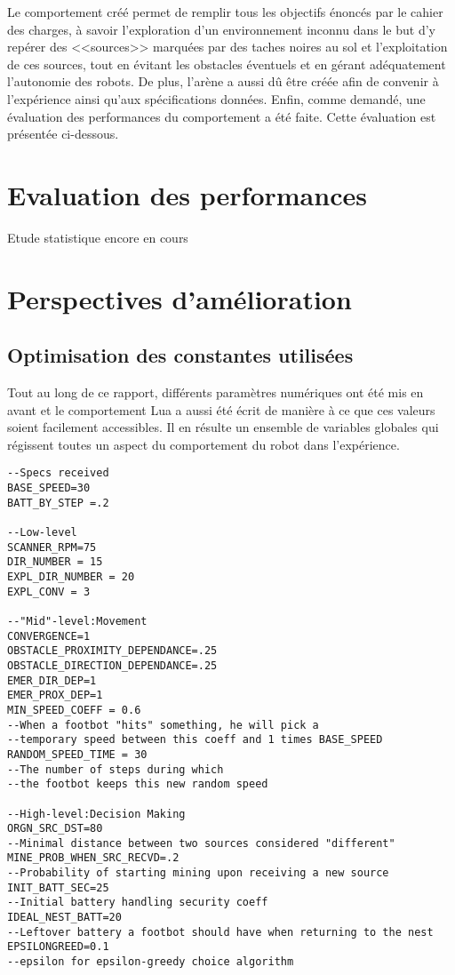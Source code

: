 Le comportement créé permet de remplir tous les objectifs énoncés par le cahier des charges, à savoir l'exploration d'un environnement inconnu dans le but d'y repérer des <<sources>> marquées par des taches noires au sol et l'exploitation de ces sources, tout en évitant les obstacles éventuels et en gérant adéquatement l'autonomie des robots. De plus, l'arène a aussi dû être créée afin de convenir à l'expérience ainsi qu'aux spécifications données. Enfin, comme demandé, une évaluation des performances du comportement a été faite. Cette évaluation est présentée ci-dessous.

\section{Evaluation des performances}

Etude statistique encore en cours

\section{Perspectives d'amélioration}

\subsection{Optimisation des constantes utilisées}
Tout au long de ce rapport, différents paramètres numériques ont été mis en avant et le comportement Lua a aussi été écrit de manière à ce que ces valeurs soient facilement accessibles. Il en résulte un ensemble de variables globales qui régissent toutes un aspect du comportement du robot dans l'expérience.

\begin{lstlisting}[caption=Définitions des variables globales]
--Specs received
BASE_SPEED=30
BATT_BY_STEP =.2

--Low-level
SCANNER_RPM=75
DIR_NUMBER = 15
EXPL_DIR_NUMBER = 20
EXPL_CONV = 3

--"Mid"-level:Movement
CONVERGENCE=1
OBSTACLE_PROXIMITY_DEPENDANCE=.25
OBSTACLE_DIRECTION_DEPENDANCE=.25
EMER_DIR_DEP=1
EMER_PROX_DEP=1
MIN_SPEED_COEFF = 0.6
--When a footbot "hits" something, he will pick a
--temporary speed between this coeff and 1 times BASE_SPEED
RANDOM_SPEED_TIME = 30
--The number of steps during which
--the footbot keeps this new random speed

--High-level:Decision Making
ORGN_SRC_DST=80
--Minimal distance between two sources considered "different"
MINE_PROB_WHEN_SRC_RECVD=.2
--Probability of starting mining upon receiving a new source
INIT_BATT_SEC=25
--Initial battery handling security coeff
IDEAL_NEST_BATT=20
--Leftover battery a footbot should have when returning to the nest
EPSILONGREED=0.1
--epsilon for epsilon-greedy choice algorithm
\end{lstlisting}

